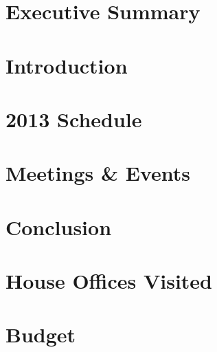 \documentclass[12pt]{article}
\begin{document}


\newpage
\tableofcontents
\thispagestyle{empty}

\begin{doublespace}

\newpage
\setcounter{page}{1} 
\section{Executive Summary}


\newpage
\section{Introduction}


\newpage
\section{2013 Schedule}


\newpage
\section{Meetings \& Events}


\newpage
\section{Conclusion}


\appendix

\newpage
\section{House Offices Visited}\label{sec:house}


\newpage
\section{Budget}\label{sec:budget}





\end{doublespace}
\end{document}
